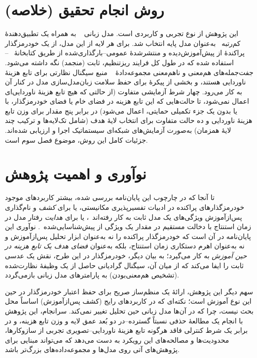 \section{روش انجام تحقیق (خلاصه)}
این پژوهش از نوع تجربی
و کاربردی است. مدل زبانی
~\cite{biderman2023pythia}
به همراه یک تطبیق‌دهندهٔ کم‌رتبه~\cite{hu2021lora}
به‌عنوان مدل پایه انتخاب شد. برای هر لایه از این مدل، از یک خودرمزگذار پراکندهٔ از پیش‌آموزش‌دیده و منتشرشدهٔ عمومی--بارگذاری‌شده از طریق کتابخانهٔ
~\cite{bloom2024saelens}--استفاده شده که در طول کل فرایند ریزتنظیم، ثابت (منجمد) نگه داشته می‌شود. جفت‌جمله‌های هم‌معنی و ناهم‌معنی مجموعه‌دادهٔ
~\cite{zhang2019paws}
منبع سیگنال نظارتی برای تابع هزینهٔ ناوردایی هستند، و بخشی از پیکرهٔ
برای حفظ سلامت زبان‌مدل‌سازی مدل در کنار آن به کار می‌رود. چهار شرط آزمایشی متفاوت (از حالتی که هیچ تابع هزینهٔ ناوردایی‌ای اعمال نمی‌شود، تا حالت‌هایی که این تابع هزینه در فضای خام یا فضای خودرمزگذار، با یا بدون یک جزء تکمیلی حمایتی، اعمال می‌شود) در برابر پنج مقدار برای وزن تابع هزینهٔ ناوردایی و ده حالت متفاوت برای انتخاب لایهٔ هدف (شامل تک‌لایه‌ها و ترکیب چند لایهٔ همزمان) به‌صورت آزمایش‌های شبکه‌ای
سیستماتیک اجرا و ارزیابی شده‌اند. جزئیات کامل این روش، موضوع فصل سوم است.

\section{نوآوری و اهمیت پژوهش}
تا آنجا که در چارچوب این پایان‌نامه بررسی شده، بیشتر کاربردهای موجود خودرمزگذارهای پراکنده در ادبیات تفسیرپذیری مکانیستی، یا برای \emph{کشف} و نام‌گذاری پس‌ازآموزش ویژگی‌های یک مدل ثابت به کار رفته‌اند~\cite{bricken2023monosemanticity,templeton2024scaling}، یا برای \emph{هدایت}
رفتار مدل در زمان استنتاج
با دخالت مستقیم در مقدار یک ویژگی از پیش‌شناسایی‌شده~\cite{turner2023actadd,templeton2024scaling}. نوآوری این پایان‌نامه در آن است که خودرمزگذار پراکنده را نه به‌عنوان ابزار تحلیل پس‌ازآموزش و نه به‌عنوان اهرم دستکاری زمان استنتاج، بلکه به‌عنوان \emph{فضای هدف یک تابع هزینه در حین آموزش} به کار می‌گیرد؛ به بیان دیگر، خودرمزگذار در این طرح، نقش یک عدسی ثابت را ایفا می‌کند که از میان آن، سیگنال گرادیانی حاصل از یک وظیفهٔ نظارت‌شده (تشخیص هم‌معنی‌بودن) به پارامترهای مدل زبانی بازمی‌گردد.

سهم دیگر این پژوهش، ارائهٔ یک منظم‌ساز صریح برای حفظ اعتبار خودرمزگذار در حین این نوع آموزش است؛ نکته‌ای که در کاربردهای رایج (کشف پس‌ازآموزش) اساساً محل بحث نیست، چرا که در آن‌ها مدل زبانی حین تحلیل تغییر نمی‌کند. سرانجام، این پژوهش با انجام یک مطالعهٔ حذفی
نسبتاً گسترده--در دو بُعد عمق لایه و وزن تابع هزینه، و در برابر یک شرط کنترلی فاقد هرگونه تابع هزینهٔ ناوردایی--تصویری تجربی از سازوکارها، محدودیت‌ها و مصالحه‌های
این رویکرد به دست می‌دهد که می‌تواند مبنایی برای پژوهش‌های آتی روی مدل‌ها و مجموعه‌داده‌های بزرگ‌تر باشد.

